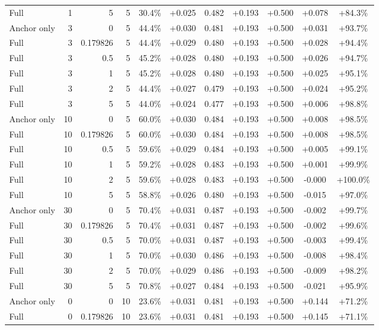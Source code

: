 \begin{table}[htbp]
\begin{tabular}{lrrrccccccc}
Full & 1 & 5 & 5 & 30.4\% & +0.025 & 0.482 & +0.193 & +0.500 & +0.078 & +84.3\% \\
Anchor only & 3 & 0 & 5 & 44.4\% & +0.030 & 0.481 & +0.193 & +0.500 & +0.031 & +93.7\% \\
Full & 3 & 0.179826 & 5 & 44.4\% & +0.029 & 0.480 & +0.193 & +0.500 & +0.028 & +94.4\% \\
Full & 3 & 0.5 & 5 & 45.2\% & +0.028 & 0.480 & +0.193 & +0.500 & +0.026 & +94.7\% \\
Full & 3 & 1 & 5 & 45.2\% & +0.028 & 0.480 & +0.193 & +0.500 & +0.025 & +95.1\% \\
Full & 3 & 2 & 5 & 44.4\% & +0.027 & 0.479 & +0.193 & +0.500 & +0.024 & +95.2\% \\
Full & 3 & 5 & 5 & 44.0\% & +0.024 & 0.477 & +0.193 & +0.500 & +0.006 & +98.8\% \\
Anchor only & 10 & 0 & 5 & 60.0\% & +0.030 & 0.484 & +0.193 & +0.500 & +0.008 & +98.5\% \\
Full & 10 & 0.179826 & 5 & 60.0\% & +0.030 & 0.484 & +0.193 & +0.500 & +0.008 & +98.5\% \\
Full & 10 & 0.5 & 5 & 59.6\% & +0.029 & 0.484 & +0.193 & +0.500 & +0.005 & +99.1\% \\
Full & 10 & 1 & 5 & 59.2\% & +0.028 & 0.483 & +0.193 & +0.500 & +0.001 & +99.9\% \\
Full & 10 & 2 & 5 & 59.6\% & +0.028 & 0.483 & +0.193 & +0.500 & -0.000 & +100.0\% \\
Full & 10 & 5 & 5 & 58.8\% & +0.026 & 0.480 & +0.193 & +0.500 & -0.015 & +97.0\% \\
Anchor only & 30 & 0 & 5 & 70.4\% & +0.031 & 0.487 & +0.193 & +0.500 & -0.002 & +99.7\% \\
Full & 30 & 0.179826 & 5 & 70.4\% & +0.031 & 0.487 & +0.193 & +0.500 & -0.002 & +99.6\% \\
Full & 30 & 0.5 & 5 & 70.0\% & +0.031 & 0.487 & +0.193 & +0.500 & -0.003 & +99.4\% \\
Full & 30 & 1 & 5 & 70.0\% & +0.030 & 0.486 & +0.193 & +0.500 & -0.008 & +98.4\% \\
Full & 30 & 2 & 5 & 70.0\% & +0.029 & 0.486 & +0.193 & +0.500 & -0.009 & +98.2\% \\
Full & 30 & 5 & 5 & 70.8\% & +0.027 & 0.484 & +0.193 & +0.500 & -0.021 & +95.9\% \\
Anchor only & 0 & 0 & 10 & 23.6\% & +0.031 & 0.481 & +0.193 & +0.500 & +0.144 & +71.2\% \\
Full & 0 & 0.179826 & 10 & 23.6\% & +0.031 & 0.481 & +0.193 & +0.500 & +0.145 & +71.1\% \\

\end{tabular}
\end{table}
